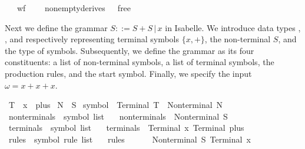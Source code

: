 \begin{isabellebody}
\ \ \ {\isachardoublequoteopen}wf{\isacharunderscore}{\kern0pt}{\isasymG}\ {\isasymG}{\isachardoublequoteclose}\isanewline
\ \ \ {\isachardoublequoteopen}nonempty{\isacharunderscore}{\kern0pt}derives\ {\isasymG}\ {\isasymlongleftrightarrow}\ {\isasymepsilon}{\isacharunderscore}{\kern0pt}free\ {\isasymG}{\isachardoublequoteclose}%
\isadelimproof
%
\endisadelimproof
%
\isatagproof
%
\endisatagproof
{\isafoldproof}%
%
\isadelimproof
%
\endisadelimproof
%
\begin{isamarkuptext}%
Next we define the grammar $S ::= S + S \, | \, x$ in Isabelle. We introduce data types , , and 
respectively representing terminal symbols $\{x, +\}$, the non-terminal $S$, and the type of symbols.
Subsequently, we define the grammar as its four constituents: a list of non-terminal symbols, a list of terminal symbols,
the production rules, and the start symbol. Finally, we specify the input $\omega = x + x + x$.%
\end{isamarkuptext}\isamarkuptrue%
\isamarkupfalse%
\ T\ {\isacharequal}{\kern0pt}\ x\ {\isacharbar}{\kern0pt}\ plus\isanewline
{}\isamarkupfalse%
\ N\ {\isacharequal}{\kern0pt}\ S\isanewline
{}\isamarkupfalse%
\ symbol\ {\isacharequal}{\kern0pt}\ Terminal\ T\ {\isacharbar}{\kern0pt}\ Nonterminal\ N\isanewline
\isanewline
{}\isamarkupfalse%
\ nonterminals\ {\isacharcolon}{\kern0pt}{\isacharcolon}{\kern0pt}\ {\isachardoublequoteopen}symbol\ list{\isachardoublequoteclose}\ \isanewline
\ \ {\isachardoublequoteopen}nonterminals\ {\isacharequal}{\kern0pt}\ {\isacharbrackleft}{\kern0pt}Nonterminal\ S{\isacharbrackright}{\kern0pt}{\isachardoublequoteclose}\isanewline
\isanewline
{}\isamarkupfalse%
\ terminals\ {\isacharcolon}{\kern0pt}{\isacharcolon}{\kern0pt}\ {\isachardoublequoteopen}symbol\ list{\isachardoublequoteclose}\ \isanewline
\ \ {\isachardoublequoteopen}terminals\ {\isacharequal}{\kern0pt}\ {\isacharbrackleft}{\kern0pt}Terminal\ x{\isacharcomma}{\kern0pt}\ Terminal\ plus{\isacharbrackright}{\kern0pt}{\isachardoublequoteclose}\isanewline
\isanewline
{}\isamarkupfalse%
\ rules\ {\isacharcolon}{\kern0pt}{\isacharcolon}{\kern0pt}\ {\isachardoublequoteopen}symbol\ rule\ list{\isachardoublequoteclose}\ \isanewline
\ \ {\isachardoublequoteopen}rules\ {\isacharequal}{\kern0pt}\ {\isacharbrackleft}{\kern0pt}\isanewline
\ \ \ \ {\isacharparenleft}{\kern0pt}Nonterminal\ S{\isacharcomma}{\kern0pt}\ {\isacharbrackleft}{\kern0pt}Terminal\ x{\isacharbrackright}{\kern0pt}{\isacharparenright}{\kern0pt}{\isacharcomma}{\kern0pt}\isanewline

\end{isabellebody}
